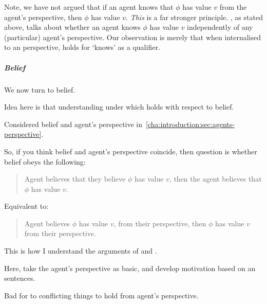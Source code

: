 \begin{note}[Caution]
  Note, we have not argued that if an agent knows that \(\phi\) has value \(v\) from the agent's perspective, then \(\phi\) has value \(v\).
  \emph{This} is a far stronger principle.
  , as stated above, talks about whether an agent knows \(\phi\) has value \(v\) independently of any (particular) agent's perspective.
  Our observation is merely that when internalised to an perspective, \ptivity{} holds for `knows' as a qualifier.
\end{note}

\subparagraph{Belief}

\begin{note}
  We now turn to belief.

  Idea here is that understanding under which \ptivity{} holds with respect to belief.
\end{note}

\begin{note}
  Considered belief and agent's perspective in~\autoref{cha:introduction:sec:agents-perspective}.

  So, if you think belief and agent's perspective coincide, then question is whether belief obeys the following:
  \begin{quote}
    Agent believes that they believe \(\phi\) has value \(v\), then the agent believes that \(\phi\) has value \(v\).
  \end{quote}
  Equivalent to:
  \begin{quote}
    Agent believes \(\phi\) has value \(v\), from their perspective, then \(\phi\) has value \(v\) from their perspective.
  \end{quote}

  This is how I understand the arguments of \citeauthor{Dancy:2000aa} and \citeauthor{Collins:1997wn}.

  Here, take the agent's perspective as basic, and develop motivation based on \citeauthor{Moore:1993wk}an sentences.
\end{note}

\begin{note}
  Bad for to conflicting things to hold from agent's perspective.
\end{note}

